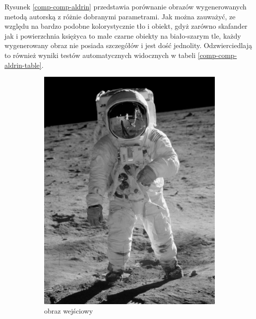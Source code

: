 	Rysunek \ref{comp-comp-aldrin} przedstawia porównanie obrazów wygenerowanych metodą autorską z różnie dobranymi parametrami. Jak można zauważyć, ze względu na bardzo podobne kolorystycznie tło i obiekt, gdyż zarówno skafander jak i powierzchnia księżyca to małe czarne obiekty na biało-szarym tle, każdy wygenerowany obraz nie posiada szczegółów i jest dość jednolity. Odzwierciedlają to również wyniki testów automatycznych widocznych w tabeli \ref{comp-comp-aldrin-table}.
	\begin{figure}[H] 
    \centering
    \begin{subfigure}{0.24\textwidth}
        \centering
        \includegraphics[width = \textwidth]{img/6-comp/aldrin_original_c10_inv0.png}
        \caption{obraz wejściowy}
        \label{comp-comp-aldrin-a}
    \end{subfigure}
    \begin{subfigure}{0.24\textwidth}
        \centering

\end{subfigure}
\end{figure}
